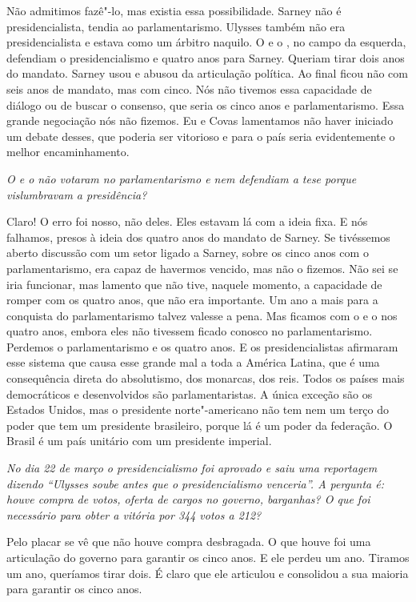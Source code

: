 Não admitimos fazê"-lo, mas existia essa possibilidade.
Sarney não é presidencialista, tendia ao parlamentarismo. Ulysses também
não era presidencialista e estava como um árbitro naquilo. O  e o ,
no campo da esquerda, defendiam o presidencialismo e quatro anos para
Sarney. Queriam tirar dois anos do mandato. Sarney usou e abusou da
articulação política. Ao final ficou não com seis anos de mandato, mas
com cinco. Nós não tivemos essa capacidade de diálogo ou de buscar o
consenso, que seria os cinco anos e parlamentarismo. Essa grande
negociação nós não fizemos. Eu e Covas lamentamos não haver iniciado um
debate desses, que poderia ser vitorioso e para o país seria
evidentemente o melhor encaminhamento.

\medskip

\noindent\emph{O  e o  não votaram no parlamentarismo e nem defendiam a
tese porque vislumbravam a presidência?}

Claro! O erro foi nosso, não deles. Eles estavam lá com
a ideia fixa. E nós falhamos, presos à ideia dos quatro anos do mandato
de Sarney. Se tivéssemos aberto discussão com um setor ligado a Sarney,
sobre os cinco anos com o parlamentarismo, era capaz de havermos
vencido, mas não o fizemos. Não sei se iria funcionar, mas lamento que
não tive, naquele momento, a capacidade de romper com os quatro anos,
que não era importante. Um ano a mais para a conquista do
parlamentarismo talvez valesse a pena. Mas ficamos com o  e o  nos
quatro anos, embora eles não tivessem ficado conosco no parlamentarismo.
Perdemos o parlamentarismo e os quatro anos. E os presidencialistas
afirmaram esse sistema que causa esse grande mal a toda a América
Latina, que é uma consequência direta do absolutismo, dos monarcas, dos
reis. Todos os países mais democráticos e desenvolvidos são
parlamentaristas. A única exceção são os Estados Unidos, mas o
presidente norte"-americano não tem nem um terço do poder que tem um
presidente brasileiro, porque lá é um poder da federação. O Brasil é um
país unitário com um presidente imperial.

\medskip

\noindent\emph{No dia 22 de março o presidencialismo foi aprovado e saiu uma
reportagem dizendo ``Ulysses soube antes que o presidencialismo
venceria''. A pergunta é: houve compra de votos, oferta de cargos no
governo, barganhas? O que foi necessário para obter a vitória por 344
votos a 212?}

Pelo placar se vê que não houve compra desbragada. O
que houve foi uma articulação do governo para garantir os cinco anos. E
ele perdeu um ano. Tiramos um ano, queríamos tirar dois. É claro que ele
articulou e consolidou a sua maioria para garantir os cinco anos.

